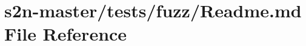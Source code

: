 \hypertarget{tests_2fuzz_2_r_e_a_d_m_e_8md}{}\section{s2n-\/master/tests/fuzz/\+Readme.md File Reference}
\label{tests_2fuzz_2_r_e_a_d_m_e_8md}
